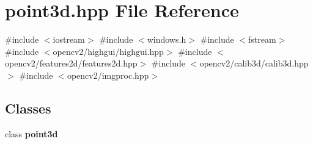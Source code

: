 \section{point3d.\+hpp File Reference}
\label{point3d_8hpp}
{\ttfamily \#include $<$iostream$>$}\newline
{\ttfamily \#include $<$windows.\+h$>$}\newline
{\ttfamily \#include $<$fstream$>$}\newline
{\ttfamily \#include $<$opencv2/highgui/highgui.\+hpp$>$}\newline
{\ttfamily \#include $<$opencv2/features2d/features2d.\+hpp$>$}\newline
{\ttfamily \#include $<$opencv2/calib3d/calib3d.\+hpp$>$}\newline
{\ttfamily \#include $<$opencv2/imgproc.\+hpp$>$}\newline
\subsection*{Classes}
\begin{DoxyCompactItemize}
\item 
class \textbf{ point3d}
\end{DoxyCompactItemize}

